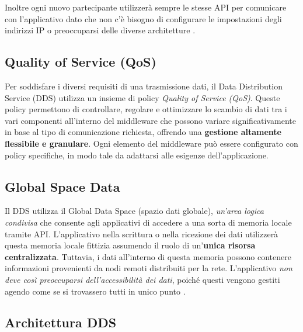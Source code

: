 Inoltre ogni nuovo partecipante 
utilizzerà sempre le stesse API per comunicare con l'applicativo dato che 
non c'è bisogno di configurare le impostazioni degli indirizzi IP o 
preoccuparsi delle diverse architetture \cite{1494965}.
 
 
\subsection{Quality of Service (QoS)}

Per soddisfare i diversi requisiti di una trasmissione dati, 
il Data Distribution Service (DDS) utilizza un insieme di policy
\textit{Quality of Service (QoS)}. Queste policy permettono di controllare, 
regolare e ottimizzare lo scambio di dati tra i vari componenti 
all'interno del middleware che possono variare 
significativamente in base al tipo di comunicazione richiesta, 
offrendo una \textbf{gestione altamente flessibile e granulare}. 
Ogni elemento del middleware può essere configurato 
con policy specifiche, in modo tale da adattarsi alle 
esigenze dell'applicazione.

\subsection{Global Space Data}
Il DDS utilizza il Global Data 
Space (spazio dati globale), \textit{un'area logica condivisa}
che consente agli applicativi
di accedere a una sorta di memoria locale tramite API.
L'applicativo nella scrittura o nella ricezione dei dati utilizzerà 
questa memoria locale fittizia assumendo il ruolo di 
un'\textbf{unica risorsa centralizzata}.
Tuttavia, i dati all'interno di questa memoria possono contenere
informazioni provenienti da nodi remoti distribuiti per la rete. 
L'applicativo 
\textit{non deve così preoccuparsi dell'accessibilità dei dati},
poiché questi vengono gestiti agendo come se si trovassero tutti in unico punto 
\cite{whatisdds}.


\subsection{Architettura DDS}


